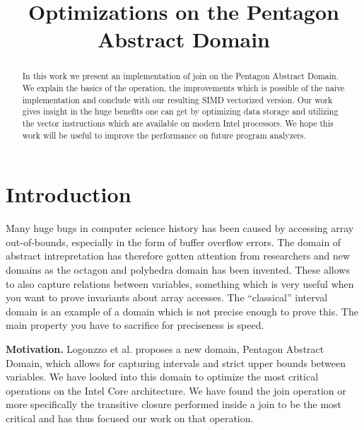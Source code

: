 \documentclass[letterpaper]{article}
\title{Optimizations on the Pentagon Abstract Domain}
\newcommand{\mypar}[1]{{\bf #1.}}
\newcommand{\erik}[1]{\textcolor{blue}{[Erik: #1]}}
\begin{document}
%
\maketitle
%


\begin{abstract}
In this work we present an implementation of join on the Pentagon Abstract Domain. We explain the basics of the operation, the improvements which is possible of the naive implementation and conclude with our resulting SIMD vectorized version. Our work gives insight in the huge benefits one can get by optimizing data storage and utilizing the vector instructions which are available on modern Intel processors. We hope this work will be useful to improve the performance on future program analyzers.
\end{abstract}

\section{Introduction}\label{sec:intro}
Many huge bugs in computer science history has been caused by accessing array out-of-bounds, especially in the form of buffer overflow errors. %
The domain of abstract intrepretation has therefore gotten attention from researchers and new domains as the octagon and polyhedra domain has been invented. These allows to also capture relations between variables, something which is very useful when you want to prove invariants about array accesses. The ``classical'' interval domain is an example of a domain which is not precise enough to prove this. The main property you have to sacrifice for preciseness is speed.



\mypar{Motivation} Logonzzo et al. proposes a new domain, Pentagon Abstract Domain, which allows for capturing intervals and strict upper bounds between variables. We have looked into this domain to optimize the most critical operations on the Intel Core architecture. We have found the join operation or more specifically the transitive closure performed inside a join to be the most critical and has thus focused our work on that operation.
\end{document}
